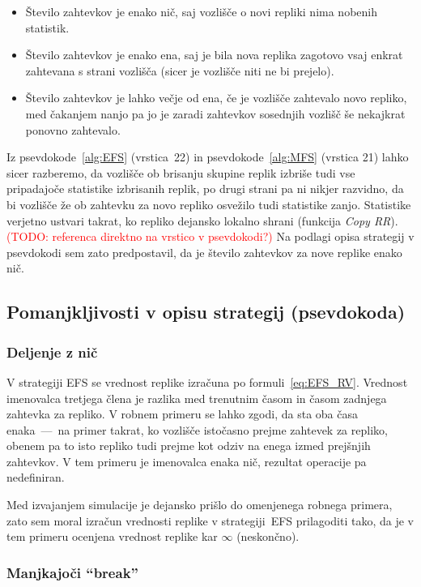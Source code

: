 \documentclass[a4paper, 12pt]{book}
\newcommand{\TODO}[1]{\textcolor{red}{(TODO: #1)}}
\begin{document}
\begin{itemize}
\item Število zahtevkov je enako nič, saj vozlišče o novi repliki nima nobenih
statistik.
\item Število zahtevkov je enako ena, saj je bila nova replika zagotovo vsaj
enkrat zahtevana s strani vozlišča (sicer je vozlišče niti ne bi prejelo).
\item Število zahtevkov je lahko večje od ena, če je vozlišče zahtevalo novo
repliko, med čakanjem nanjo pa jo je zaradi zahtevkov sosednjih vozlišč
še nekajkrat ponovno zahtevalo.
\end{itemize}

Iz psevdokode~\ref{alg:EFS} (vrstica~22) in psevdokode~\ref{alg:MFS} (vrstica 21)
lahko sicer razberemo, da vozlišče ob brisanju skupine replik izbriše tudi vse
pripadajoče statistike izbrisanih replik, po drugi strani pa ni nikjer razvidno,
da bi vozlišče že ob zahtevku za novo repliko osvežilo tudi statistike zanjo.
Statistike verjetno ustvari takrat, ko repliko dejansko lokalno shrani
(funkcija \textit{Copy RR}). \TODO{referenca direktno na vrstico v psevdokodi?}
Na podlagi opisa strategij v psevdokodi sem zato predpostavil, da je število
zahtevkov za nove replike enako nič.


\subsection{Pomanjkljivosti v opisu strategij (psevdokoda)}

\subsubsection{Deljenje z nič}

V strategiji EFS se vrednost replike izračuna po formuli~\eqref{eq:EFS_RV}.
Vrednost imenovalca tretjega člena je razlika med trenutnim časom in časom
zadnjega zahtevka za repliko. V robnem primeru se lahko zgodi, da sta oba časa
enaka~---~na primer takrat, ko vozlišče istočasno prejme zahtevek za repliko,
obenem pa to isto repliko tudi prejme kot odziv na enega izmed prejšnjih
zahtevkov. V tem primeru je imenovalca enaka nič, rezultat operacije pa
nedefiniran.

Med izvajanjem simulacije je dejansko prišlo do omenjenega robnega primera,
zato sem moral izračun vrednosti replike v strategiji~EFS prilagoditi tako,
da je v tem primeru ocenjena vrednost replike kar $\infty$ (neskončno).

\subsubsection{Manjkajoči ``break''}
\end{document}
